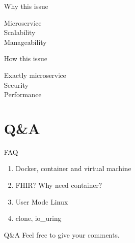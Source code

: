 \documentclass{beamer}
\begin{document}
\begin{frame}{Why this issue}
    \begin{center}
        \Huge{Microservice}\\
        \Huge{Scalability}\\
        \Huge{Manageability}\\
    \end{center}
\end{frame}

\begin{frame}{How this issue}
    \begin{center}
        \Huge{Exactly microservice}\\
        \Huge{Security}\\
        \Huge{Performance}\\
    \end{center}
\end{frame}

\section{Q\&A}
\begin{frame}{FAQ}
    \begin{enumerate}
        \item Docker, container and virtual machine
        \item FHIR? Why need container?
        \item User Mode Linux
        \item clone, io\_uring
    \end{enumerate}
\end{frame}

\begin{frame}{Q\&A}
    \centering
    \Large Feel free to give your comments.
\end{frame}
\end{document}
